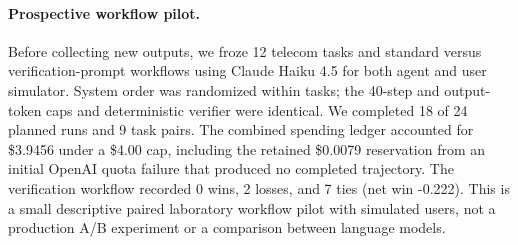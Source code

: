 \paragraph{Prospective workflow pilot.} Before collecting new outputs, we froze 12 telecom tasks and standard versus verification-prompt workflows using Claude Haiku 4.5 for both agent and user simulator. System order was randomized within tasks; the 40-step and output-token caps and deterministic verifier were identical. We completed 18 of 24 planned runs and 9 task pairs. The combined spending ledger accounted for \$3.9456 under a \$4.00 cap, including the retained \$0.0079 reservation from an initial OpenAI quota failure that produced no completed trajectory. The verification workflow recorded 0 wins, 2 losses, and 7 ties (net win -0.222). This is a small descriptive paired laboratory workflow pilot with simulated users, not a production A/B experiment or a comparison between language models.
